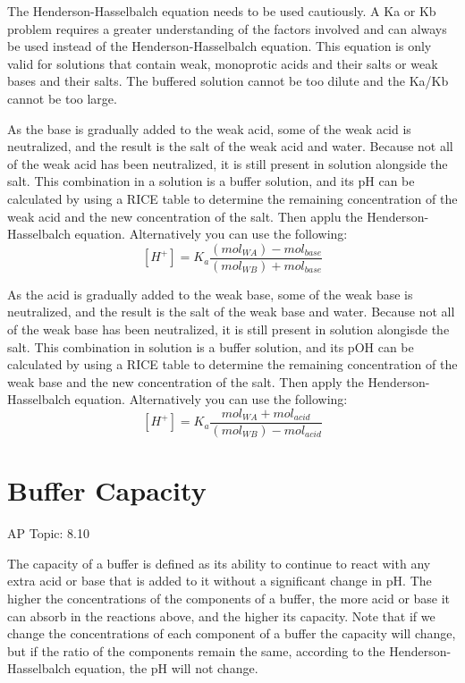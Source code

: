 \documentclass[../chem.tex]{subfiles}
\begin{document}
The Henderson-Hasselbalch equation needs to be used cautiously. A Ka or Kb problem requires a greater understanding of the factors involved and can always 
be used instead of the Henderson-Hasselbalch equation. This equation is only valid for solutions that contain weak, monoprotic acids and their salts or weak bases and their salts.
The buffered solution cannot be too dilute and the Ka/Kb cannot be too large.

As the base is gradually added to the weak acid, some of the weak acid is neutralized, and the result is the salt of the weak acid and water. Because 
not all of the weak acid has been neutralized, it is still present in solution alongside the salt. This combination in a solution is a buffer solution, and its 
pH can be calculated by using a RICE table to determine the remaining concentration of the weak acid and the new concentration of the salt. Then applu the Henderson-Hasselbalch equation.
Alternatively you can use the following:
\[[H^+] = K_a \frac{(mol_{WA})-mol_{base}}{(mol_{WB})+mol_{base}}\]

As the acid is gradually added to the weak base, some of the weak base is neutralized, and the result is the salt of the weak base and water. Because not 
all of the weak base has been neutralized, it is still present in solution alongisde the salt. This combination in solution is a buffer solution,
and its pOH can be calculated by using a RICE table to determine the remaining concentration of the weak base and the new concentration of the salt. Then apply the Henderson-Hasselbalch equation.
Alternatively you can use the following:
\[[H^+] = K_a \frac{mol_{WA}+mol_{acid}}{(mol_{WB})-mol_{acid}}\]

\section{Buffer Capacity}
AP Topic: 8.10

The capacity of a buffer is defined as its ability to continue to react with any extra acid or base that is added to it without a significant 
change in pH. The higher the concentrations of the components of a buffer, the more acid or base it can absorb in the reactions above, and the higher its capacity.
Note that if we change the concentrations of each component of a buffer the capacity will change, but if the ratio of the components remain the same,
according to the Henderson-Hasselbalch equation, the pH will not change.
\end{document}
